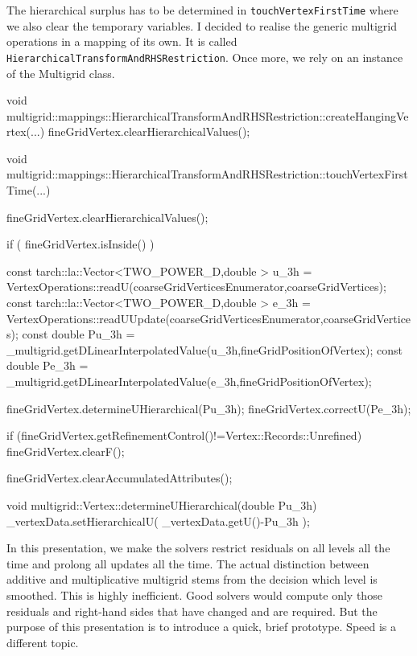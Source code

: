 \noindent
The hierarchical surplus has to be determined in \texttt{touchVertexFirstTime}
where we also clear the temporary variables.
I decided to realise the generic multigrid operations in a mapping of its own. 
It is called \texttt{HierarchicalTransformAndRHSRestriction}.
Once more, we rely on an instance of the Multigrid class.

\begin{code}
void
multigrid::mappings::HierarchicalTransformAndRHSRestriction::createHangingVertex(...) { 
 fineGridVertex.clearHierarchicalValues();
}

void multigrid::mappings::HierarchicalTransformAndRHSRestriction::touchVertexFirstTime(...) {
 fineGridVertex.clearHierarchicalValues();

 if ( fineGridVertex.isInside() ) {
   const tarch::la::Vector<TWO_POWER_D,double > u_3h  = 
     VertexOperations::readU(coarseGridVerticesEnumerator,coarseGridVertices);
   const tarch::la::Vector<TWO_POWER_D,double > e_3h  = 
     VertexOperations::readUUpdate(coarseGridVerticesEnumerator,coarseGridVertices);
   const double                                 Pu_3h = 
     _multigrid.getDLinearInterpolatedValue(u_3h,fineGridPositionOfVertex);
   const double                                 Pe_3h =
     _multigrid.getDLinearInterpolatedValue(e_3h,fineGridPositionOfVertex);

   fineGridVertex.determineUHierarchical(Pu_3h);
   fineGridVertex.correctU(Pe_3h);

   if (fineGridVertex.getRefinementControl()!=Vertex::Records::Unrefined) {
     fineGridVertex.clearF();
   }
 }

 fineGridVertex.clearAccumulatedAttributes();
}

void multigrid::Vertex::determineUHierarchical(double Pu_3h) {
  _vertexData.setHierarchicalU( _vertexData.getU()-Pu_3h );
}
\end{code}


\begin{remark}
  In this presentation, we make the solvers restrict residuals on all levels all
  the time and prolong all updates all the time.
  The actual distinction between additive and multiplicative multigrid stems from the decision which
  level is smoothed. This is
  highly inefficient.
  Good solvers would compute only those residuals and right-hand sides that have changed and
  are required. But the purpose of this presentation is to introduce a quick,
  brief prototype. Speed is a different topic.
\end{remark}

